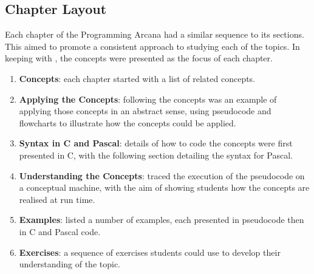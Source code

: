 


\clearpage
\subsection{Chapter Layout} %
\label{ssub:chapter_layout}

Each chapter of the Programming Arcana had a similar sequence to its sections. This aimed to promote a consistent approach to studying each of the topics. In keeping with , the concepts were presented as the focus of each chapter. %

\begin{enumerate}
  \item \textbf{Concepts}: each chapter started with a list of related concepts.
  \item \textbf{Applying the Concepts}: following the concepts was an example of applying those concepts in an abstract sense, using pseudocode and flowcharts to illustrate how the concepts could be applied.
  \item \textbf{Syntax in C and Pascal}: details of how to code the concepts were first presented in C, with the following section detailing the syntax for Pascal.
  \item \textbf{Understanding the Concepts}: traced the execution of the pseudocode on a conceptual machine, with the aim of showing students how the concepts are realised at run time. 
  \item \textbf{Examples}: listed a number of examples, each presented in pseudocode then in C and Pascal code.
  \item \textbf{Exercises}: a sequence of exercises students could use to develop their understanding of the topic.
\end{enumerate}

